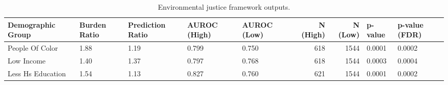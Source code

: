 \begin{table}
\caption{Environmental justice framework outputs.}
\label{tab:ext-ej-framework}
\begin{tabular}{lllllrrll}
\toprule
Demographic Group & Burden Ratio & Prediction Ratio & AUROC (High) & AUROC (Low) & N (High) & N (Low) & p-value & p-value (FDR) \\
\midrule
People Of Color & 1.88 & 1.19 & 0.799 & 0.750 & 618 & 1544 & 0.0001 & 0.0002 \\
Low Income & 1.40 & 1.37 & 0.797 & 0.768 & 618 & 1544 & 0.0003 & 0.0004 \\
Less Hs Education & 1.54 & 1.13 & 0.827 & 0.760 & 621 & 1544 & 0.0001 & 0.0002 \\
\bottomrule
\end{tabular}
\end{table}
